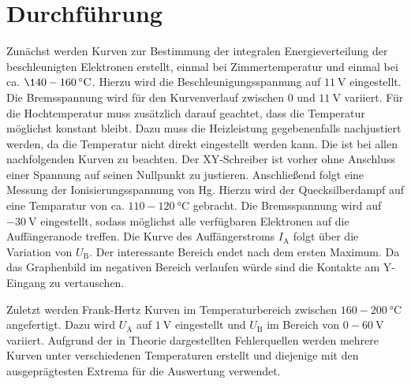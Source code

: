 
\section{Durchführung}
\label{sec:Durchführung}
Zunächst werden Kurven zur Bestimmung der integralen Energieverteilung der
beschleunigten Elektronen erstellt, einmal bei Zimmertemperatur und einmal bei
ca. $\140- \SI{160}{\degreeCelsius}$. Hierzu wird die Beschleunigungsspannung auf
$\SI{11}{\volt}$ eingestellt. Die Bremsspannung wird für den Kurvenverlauf
zwischen $0$ und $\SI{11}{\volt}$ variiert. Für die Hochtemperatur muss zusätzlich
darauf geachtet, dass die Temperatur möglichst konstant bleibt. Dazu muss die
Heizleistung gegebenenfalls nachjustiert werden, da die Temperatur nicht direkt
eingestellt werden kann. Die ist bei allen nachfolgenden Kurven zu beachten. Der
XY-Schreiber ist vorher ohne Anschluss einer Spannung auf seinen Nullpunkt zu justieren.
Anschließend folgt eine Messung der Ionisierungsspannung von Hg. Hierzu wird der
Quecksilberdampf auf eine Temparatur von ca. $110- \SI{120}{\degreeCelsius}$ gebracht.
Die Bremsspannung wird auf $\SI{-30}{\volt}$ eingestellt, sodass möglichst alle
verfügbaren Elektronen auf die Auffängeranode treffen. Die Kurve des Auffängerstroms
$I_\text{A}$ folgt über die Variation von $U_\text{B}$. Der interessante Bereich endet
nach dem ersten Maximum. Da das Graphenbild im negativen Bereich verlaufen würde sind die
Kontakte am Y-Eingang zu vertauschen.

Zuletzt werden Frank-Hertz Kurven im Temperaturbereich zwischen $160-\SI{200}{\degreeCelsius}$
angefertigt. Dazu wird $U_\text{A}$ auf $\SI{1}{\volt}$ eingestellt und $U_\text{B}$
im Bereich von $0-\SI{60}{\volt}$ variiert. Aufgrund der in Theorie dargestellten
Fehlerquellen werden mehrere Kurven unter verschiedenen Temperaturen erstellt und
diejenige mit den ausgeprägtesten Extrema für die Auswertung verwendet.
